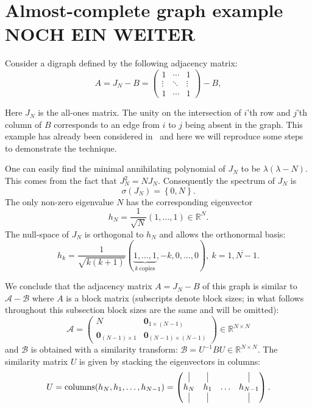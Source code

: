 \documentclass[a4paper]{article}
\theoremstyle{definition}
\begin{document}
\section{Almost-complete graph example NOCH EIN WEITER}

Consider a digraph defined by the following adjacency matrix:
\[
    A = J_N - B = \begin{pmatrix}1 & \cdots & 1 \\ \vdots & \ddots & \vdots \\ 1 & \cdots & 1\end{pmatrix} - B,
\]

Here \( J_N \) is the all-ones matrix.
The unity on the intersection
of \( i \)'th row and \( j \)'th column of \( B \)
corresponds to an edge from \( i \) to \( j \)
being absent in the graph.
This example has already been considered in~\cite{sergekozlukov@volgograd}
and here we will reproduce some steps to demonstrate the technique.

One can easily find the minimal annihilating polynomial of \( J_N \)
    to be \( \lambda(\lambda - N) \).
This comes from the fact that \( J_N^2 = N J_N \).
Consequently the spectrum of \( J_N \) is
\[
    \sigma(J_N) = \left\{0, N\right\}.
\]
The only non-zero eigenvalue \( N \) has the corresponding eigenvector
\[
    h_N = \frac{1}{\sqrt{N}} \left(1, \ldots, 1\right)\in\mathbb{R}^N.
\]
The null-space of \( J_N \) is orthogonal to \( h_N \)
    and allows the orthonormal basis:
\[
    h_k = \frac{1}{\sqrt{k(k+1)}} \left(\underbrace{1, \ldots, 1}_{k\ \text{copies}}, -k, 0, \ldots, 0\right),\ k=\overline{1, N-1}.
\]

We conclude that the adjacency matrix \( A = J_N - B \) of this graph
    is similar to \( \mathcal{A} - \mathcal{B} \)
    where \( A \) is a block matrix (subscripts denote block sizes; in what follows throughout this subsection block sizes are the same and will be omitted):
    \[
        \mathcal{A} = \left(\begin{array}{c|c}
        N & \mathbf{0}_{1{\times}(N{-}1)} \\ \hline
            \mathbf{0}_{(N{-}1){\times}1} & \mathbf{0}_{(N{-}1){\times}(N{-}1)}
        \end{array}\right) \in \mathbb{R}^{N{\times}N}
    \]
    and \( \mathcal{B} \) is obtained with a similarity transform:
    \(
        \mathcal{B} = U^{-1} B U \in \mathbb{R}^{N{\times}N}.
    \)
The similarity matrix \( U \) is given by stacking the eigenvectors in columns:
    \[
        U = \operatorname{columns}(h_N, h_1, \ldots, h_{N-1}) =
        \begin{pmatrix}
            \vline & \vline &        & \vline \\
            h_N    & h_1    & \ldots & h_{N-1} \\
            \vline & \vline &        & \vline

        \end{pmatrix}.
    \]
\end{document}
